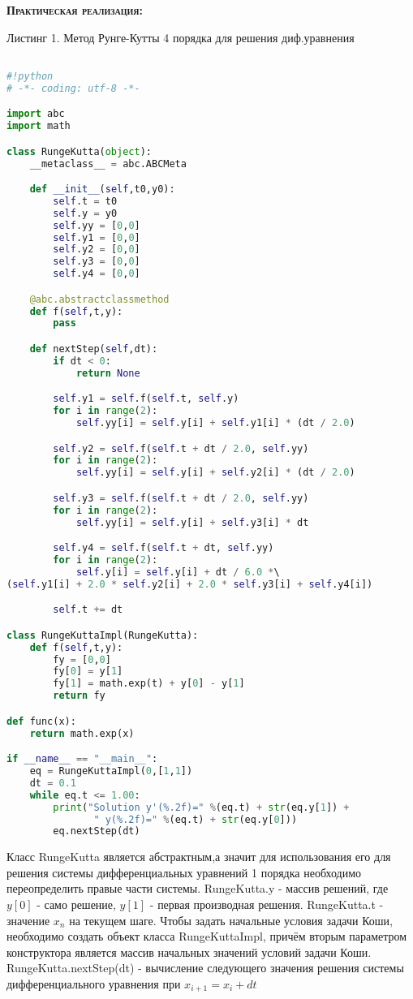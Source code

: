 \documentclass [12pt]{article}
\begin{document}
\textsc{\textbf{Практическая реализация:}}

Листинг 1. Метод Рунге-Кутты 4 порядка для решения диф.уравнения
\begin{lstlisting}[language=python]

#!python
# -*- coding: utf-8 -*-

import abc
import math

class RungeKutta(object):
    __metaclass__ = abc.ABCMeta

    def __init__(self,t0,y0):
        self.t = t0
        self.y = y0
        self.yy = [0,0]
        self.y1 = [0,0]
        self.y2 = [0,0]
        self.y3 = [0,0]
        self.y4 = [0,0]

    @abc.abstractclassmethod
    def f(self,t,y):
        pass

    def nextStep(self,dt):
        if dt < 0:
            return None

        self.y1 = self.f(self.t, self.y)
        for i in range(2):
            self.yy[i] = self.y[i] + self.y1[i] * (dt / 2.0)

        self.y2 = self.f(self.t + dt / 2.0, self.yy)
        for i in range(2):
            self.yy[i] = self.y[i] + self.y2[i] * (dt / 2.0)

        self.y3 = self.f(self.t + dt / 2.0, self.yy)
        for i in range(2):
            self.yy[i] = self.y[i] + self.y3[i] * dt

        self.y4 = self.f(self.t + dt, self.yy)
        for i in range(2):
            self.y[i] = self.y[i] + dt / 6.0 *\ 
(self.y1[i] + 2.0 * self.y2[i] + 2.0 * self.y3[i] + self.y4[i])

        self.t += dt

class RungeKuttaImpl(RungeKutta):
    def f(self,t,y):
        fy = [0,0]
        fy[0] = y[1]
        fy[1] = math.exp(t) + y[0] - y[1]
        return fy

def func(x):
    return math.exp(x)

if __name__ == "__main__":
    eq = RungeKuttaImpl(0,[1,1])
    dt = 0.1
    while eq.t <= 1.00:
        print("Solution y'(%.2f)=" %(eq.t) + str(eq.y[1]) + 
		       " y(%.2f)=" %(eq.t) + str(eq.y[0]))
        eq.nextStep(dt)

\end{lstlisting}

Класс RungeKutta является абстрактным,а значит для использования его для решения системы дифференциальных уравнений 1 порядка необходимо переопределить правые части системы. RungeKutta.y - массив решений, где $y[0]$ - само решение, $y[1]$ - первая производная решения. RungeKutta.t - значение $x_n$ на текущем шаге. Чтобы задать начальные условия задачи Коши, необходимо создать объект класса RungeKuttaImpl, причём вторым параметром конструктора является массив начальных значений условий задачи Коши. RungeKutta.nextStep(dt) - вычисление следующего значения решения системы дифференциального уравнения при $x_{i+1}=x_{i}+dt$
\end{document}
